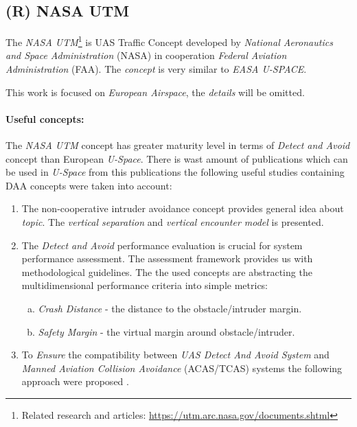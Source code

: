 \subsection{(R) NASA UTM}\label{sec:NASAUtm}

\noindent The \emph{NASA UTM}\footnote{Related research and articles: \url{https://utm.arc.nasa.gov/documents.shtml}} is UAS Traffic Concept developed by \emph{National Aeronautics and Space Administration} (NASA) in cooperation \emph{Federal Aviation Administration} (FAA). The \emph{concept} is very similar to \emph{EASA U-SPACE}.

\begin{note}
    This work is focused on \emph{European Airspace}, the \emph{details} will be omitted. 
\end{note}

\paragraph{Useful concepts:} The \emph{NASA UTM} concept has greater maturity level in terms of \emph{Detect and Avoid} concept than European \emph{U-Space}. There is wast amount of publications which can be used in \emph{U-Space} from this publications the following useful studies containing DAA concepts were taken into account:

\begin{enumerate}    
    \item The non-cooperative intruder avoidance concept \cite{cone2017uas} provides general idea about \emph{topic}. The \emph{vertical separation} and \emph{vertical encounter model} is presented.
    
    \item The \emph{Detect and Avoid} performance evaluation is crucial for system performance assessment. The assessment framework \cite{lee2016wide} provides us with methodological guidelines. The the used concepts are abstracting the multidimensional performance criteria into simple metrics:
    
    \begin{enumerate}[a.]
        \item \emph{Crash Distance} - the distance to the obstacle/intruder margin.
        
        \item \emph{Safety Margin} - the virtual margin around obstacle/intruder.
    \end{enumerate}
    
    \item To \emph{Ensure} the compatibility between \emph{UAS Detect And Avoid System} and \emph{Manned Aviation Collision Avoidance} (ACAS/TCAS) systems the following approach were proposed \cite{thipphavong2017ensuring}.
\end{enumerate}
